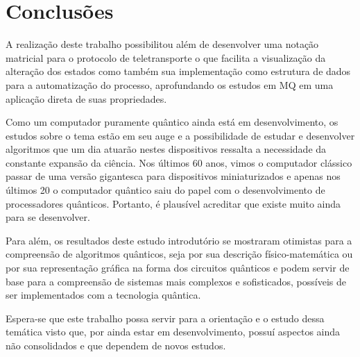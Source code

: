 
\chapter{Conclusões}

A realização deste trabalho possibilitou além de desenvolver uma notação matricial para o protocolo de teletransporte o que facilita a visualização da alteração dos estados como também sua implementação como estrutura de dados para a automatização do processo, aprofundando os estudos em MQ em uma aplicação direta de suas propriedades.

Como um computador puramente quântico ainda está em desenvolvimento, os estudos sobre o tema estão em seu auge e a possibilidade de estudar e desenvolver algoritmos que um dia atuarão nestes dispositivos ressalta a necessidade da constante expansão da ciência. Nos últimos 60 anos, vimos o computador clássico passar de uma versão gigantesca para dispositivos miniaturizados e apenas nos últimos 20 o computador quântico saiu do papel com o desenvolvimento de processadores quânticos. Portanto, é plausível acreditar que existe muito ainda para se desenvolver.

Para além, os resultados deste estudo introdutório se mostraram otimistas para a compreensão de algoritmos quânticos, seja por sua descrição físico-matemática ou por sua representação gráfica na forma dos circuitos quânticos e podem servir de base para a compreensão de sistemas mais complexos e sofisticados, possíveis de ser implementados com a tecnologia quântica.

Espera-se que este trabalho possa servir para a orientação e o estudo dessa temática visto que, por ainda estar em desenvolvimento, possuí aspectos ainda não consolidados e que dependem de novos estudos.

